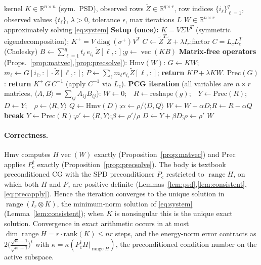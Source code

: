 \documentclass[12pt]{article}
\DeclareMathOperator{\vecop}{vec}
\DeclareMathOperator{\diag}{diag}
\DeclareMathOperator{\range}{range}
\newcommand{\bR}{\mathbb{R}}
\newcommand{\tZ}{\tilde Z}
\begin{document}
\begin{algorithm}[H]
\caption{PCG for the mode-$k$ RKHS subproblem (matrix-free)}
\begin{algorithmic}[1]
\Require kernel $K\in\bR^{n\times n}$ (sym.\ PSD), observed rows $\tZ\in\bR^{q\times r}$,
row indices $\{i_\ell\}_{\ell=1}^q$, observed values $\{t_\ell\}$, $\lambda>0$,
tolerance $\epsilon$, max iterations $L$
\Ensure $W\in\bR^{n\times r}$ approximately solving \eqref{eq:system}
\Statex \textbf{Setup (once):}
\State $K=V\Sigma V^{T}$ (symmetric eigendecomposition); $K^{+}=V\diag(\sigma^{+})V^{T}$ 
\State $C\gets \tZ^{T}\tZ+\lambda I_r$;\quad factor $C=L_cL_c^{T}$ (Cholesky) 
\State $B\gets \sum_{\ell=1}^q t_\ell\,e_{i_\ell}\,\tZ[\ell,:]$;\quad $g\gets\vecop(KB)$ 
\Statex \textbf{Matrix-free operators} (Props.~\ref{prop:matvec},\ref{prop:precsolve}):
\Statex \quad $\mathrm{Hmv}(W)$: $G\gets KW$; $m_\ell\gets G[i_\ell,:]\cdot\tZ[\ell,:]$;
$P\gets\sum_\ell m_\ell e_{i_\ell}\tZ[\ell,:]$; \textbf{return} $KP+\lambda KW$.
\Statex \quad $\mathrm{Prec}(G)$: \textbf{return} $K^{+}\,G\,C^{-1}$ (apply $C^{-1}$ via $L_c$).
\Statex \textbf{PCG iteration} (all variables are $n\times r$ matrices, $\langle A,B\rangle=\sum_{ij}A_{ij}B_{ij}$):
\State $W\gets 0$;\ \ $R\gets \mathrm{reshape}(g)$;\ \ $Y\gets\mathrm{Prec}(R)$;\ \ $D\gets Y$;\ \ $\rho\gets\langle R,Y\rangle$
  \State $Q\gets \mathrm{Hmv}(D)$;\quad $\alpha\gets \rho/\langle D,Q\rangle$
  \State $W\gets W+\alpha D$;\quad $R\gets R-\alpha Q$
   \textbf{break} \EndIf
  \State $Y\gets \mathrm{Prec}(R)$;\quad $\rho'\gets\langle R,Y\rangle$;\quad $\beta\gets \rho'/\rho$
  \State $D\gets Y+\beta D$;\quad $\rho\gets\rho'$
\EndFor
\State \Return $W$
\end{algorithmic}
\end{algorithm}

\paragraph{Correctness.}
$\mathrm{Hmv}$ computes $H\vecop(W)$ exactly (Proposition~\ref{prop:matvec}) and
$\mathrm{Prec}$ applies $P_{\mathrm{c}}^{\dagger}$ exactly
(Proposition~\ref{prop:precsolve}). The body is textbook preconditioned CG with the
SPD preconditioner $P_{\mathrm{c}}$ restricted to $\range H$, on which both $H$ and
$P_{\mathrm{c}}$ are positive definite (Lemmas~\ref{lem:psd},\ref{lem:consistent},
\eqref{eq:precapply}). Hence the iteration converges to the unique solution in
$\range(I_r\otimes K)$, the minimum-norm solution of \eqref{eq:system}
(Lemma~\ref{lem:consistent}); when $K$ is nonsingular this is the unique exact
solution. Convergence in exact arithmetic occurs in at most
$\dim\range H=r\cdot\mathrm{rank}(K)\le nr$ steps, and the energy-norm error contracts
as $2\big(\frac{\sqrt\kappa-1}{\sqrt\kappa+1}\big)^{t}$ with
$\kappa=\kappa(P_{\mathrm{c}}^{\dagger}H|_{\range H})$, the preconditioned condition
number on the active subspace.
\end{document}
